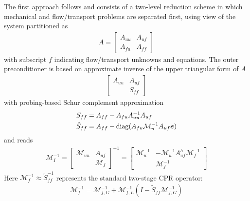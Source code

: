 The first approach follows \cite{White2019} and consists of a two-level reduction scheme in which mechanical and flow/transport problems are separated first, using view of the system partitioned as
\begin{align}
    A = 
    \begin{bmatrix}
        A_{uu} & A_{uf} \\
        A_{fu} & A_{ff}
    \end{bmatrix}
\end{align}
with subscript $f$ indicating flow/transport unknowns and equations.   The outer preconditioner is based on approximate inverse of the upper triangular form of $A$
\begin{align}
    \begin{bmatrix}
        A_{uu} & A_{uf} \\
               & S_{ff}
    \end{bmatrix}
\end{align}
with probing-based Schur complement approximation
\begin{align}
    S_{ff} &= A_{ff} - A_{fu}A_{uu}^{-1}A_{uf} \\
    \tilde{S}_{ff} &= A_{ff} - \operatorname{diag}(A_{fu}\mathcal{M}_u^{-1}A_{uf}\bm{e})
\end{align}
and reads
\begin{align}
    \mathcal{M}_I^{-1} =
    \begin{bmatrix}
        \mathcal{M}_{uu} & A_{uf}          \\
                         & \mathcal{M}_{f}
    \end{bmatrix}^{-1}
    =
    \begin{bmatrix}
        \mathcal{M}_{u}^{-1} & -\mathcal{M}_{u}^{-1} A_{uf}^h \mathcal{M}_{f}^{-1} \\
                             &  \mathcal{M}_{f}^{-1}
    \end{bmatrix}
\end{align}
Here $\mathcal{M}_f^{-1} \approx \tilde{S}_{ff}^{-1}$ represents the standard two-stage CPR operator:
\begin{align}
    \mathcal{M}_f^{-1} = \mathcal{M}_{f,G}^{-1} + \mathcal{M}_{f,L}^{-1}\left(I - \tilde{S}_{ff}\mathcal{M}_{f,G}^{-1}\right)
\end{align}
